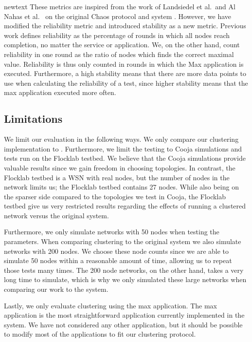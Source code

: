 \begin{newtext}{newtext}
These metrics are inspired from the work of Landsiedel et al.~and Al Nahas et al.~ on the original Chaos protocol and \atwo{} system \cite{chaos-introduction-paper, a2-introduction-paper}. However, we have modified the reliability metric and introduced stability as a new metric. Previous work defines reliability as the percentage of rounds in which all nodes reach completion, no matter the service or application. We, on the other hand, count reliability in one round as the ratio of nodes which finds the correct maximal value. Reliability is thus only counted in rounds in which the Max application is executed. Furthermore, a high stability means that there are more data points to use when calculating the reliability of a test, since higher stability means that the max application executed more often.
\end{newtext}

\subsection{Limitations}
We limit our evaluation in the following ways. We only compare our clustering implementation to \atwo{}. Furthermore, we limit the testing to Cooja simulations and tests run on the Flocklab testbed. We believe that the Cooja simulations provide valuable results since we gain freedom in choosing topologies. In contrast, the Flocklab testbed is a WSN with real nodes, but the number of nodes in the network limits us; the Flocklab testbed contains 27 nodes. While also being on the sparser side compared to the topologies we test in Cooja, the Flocklab testbed give us very restricted results regarding the effects of running a clustered network versus the original \atwo{} system.

Furthermore, we only simulate networks with 50 nodes when testing the parameters. When comparing clustering to the original \atwo{} system we also simulate networks with 200 nodes. We choose these node counts since we are able to simulate 50 nodes within a reasonable amount of time, allowing us to repeat those tests many times. The 200 node networks, on the other hand, takes a very long time to simulate, which is why we only simulated these large networks when comparing our work to the \atwo{} system.

Lastly, we only evaluate clustering using the max application. The max application is the most straightforward application currently implemented in the \atwo{} system. We have not considered any other application, but it should be possible to modify most of the applications to fit our clustering protocol.

